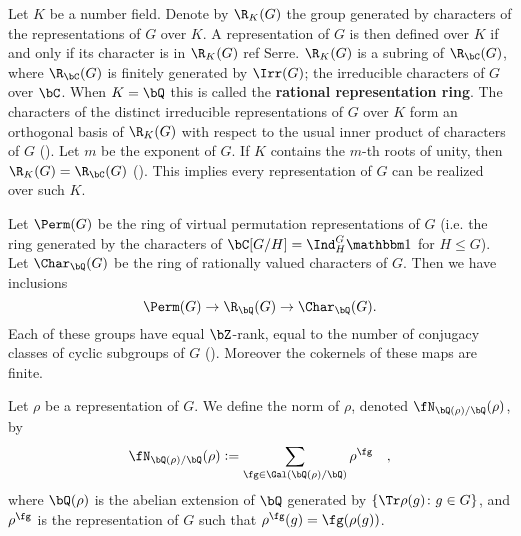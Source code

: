 
Let $K$ be a number field. Denote by $\R_K(G)$ the group generated by characters of the representations of $G$ over $K$. A representation of $G$ is then defined over $K$ if and only if its character is in $\R_K(G)$ {\color{red} ref Serre}.
$\R_K(G)$ is a subring of $\R_{\bC}(G)$, where $\R_{\bC}(G)$ is finitely generated by $\Irr(G)$; the irreducible characters of $G$ over $\bC$.
When $K = \bQ$ this is called the \textbf{rational representation ring}.
The characters of the distinct irreducible representations of $G$ over $K$ form an orthogonal basis of $\R_K(G)$ with respect to the usual inner product of characters of $G$ (\cite[Proposition 32]{Serre}).
Let $m$ be the exponent of $G$. If $K$ contains the $m$-th roots of unity, then $\R_K(G) = \R_{\bC}(G)$ (\cite[Theorem 24]{Serre}). This implies every representation of $G$ can be realized over such $K$. 
\vspace{1em}

Let $\Perm(G)$ be the ring of virtual permutation representations of $G$ (i.e. the ring generated by the characters of $\bC[G / H] = \Ind_{H}^G \trivial$ for $H \leq G$). Let $\Char_{\bQ}(G)$ be the ring of rationally valued characters of $G$. Then we have inclusions 
\[ \Perm(G) \to \R_{\bQ}(G) \to \Char_{\bQ}(G). \]
Each of these groups have equal $\bZ$-rank, equal to the number of conjugacy classes of cyclic subgroups of $G$ (\cite[Chapter 13, \S13.1]{Serre}). Moreover the cokernels of these maps are finite.

\begin{defn}\label{rho-norm}
    Let $\rho$ be a representation of $G$. We define the norm of $\rho$, denoted $\repnorm{\rho}$, by 
    \[
    \repnorm{\rho} \defeq \sum_{\fg \in \Gal(\bQ(\rho)/\bQ)}  \rho^\fg \quad,
    \]
    where $\bQ(\rho)$ is the abelian extension of $\bQ$ generated by $\{ \Tr \rho(g) \colon g \in G \}$, and $\rho^\fg$ is the representation of $G$ such that $\rho^{\fg}(g) = \fg(\rho(g))$.
\end{defn}

